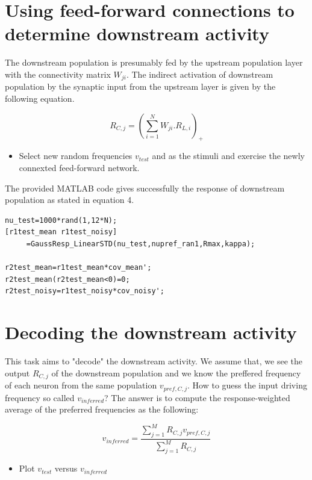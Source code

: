 \documentclass{article}
\begin{document}
\section{Using feed-forward connections to determine downstream activity}

The downstream population is presumably fed by the upstream population layer with the connectivity matrix $W_{ji}$. The indirect activation of downstream population by the synaptic input from the upstream layer is given by the following equation.

\begin{equation}
 R_{C,j}=(\sum_{i=1}^N W_{ji}\textbf{.}R_{L,i} )_+
\end{equation}

\begin{itemize}
 \item Select new random frequencies $v_{test}$ and as the stimuli and exercise the newly connexted feed-forward network.
\end{itemize}

The provided MATLAB code gives successfully the response of downstream population as stated in equation 4. 

\begin{verbatim}
nu_test=1000*rand(1,12*N);
[r1test_mean r1test_noisy] 
     =GaussResp_LinearSTD(nu_test,nupref_ran1,Rmax,kappa);

r2test_mean=r1test_mean*cov_mean';
r2test_mean(r2test_mean<0)=0;
r2test_noisy=r1test_noisy*cov_noisy';

\end{verbatim}

\section{Decoding the downstream activity}
This task aims to "decode" the downstream activity. We assume that, we see the output $R_{C,j}$ of the downstream population and we know the preffered frequency of each neuron from the same population $v_{pref,C,j}$. How to guess the input driving frequency so called $v_{inferred}$? The answer is to compute the response-weighted average of the preferred frequencies as the following:

\begin{equation}
 v_{inferred}=\dfrac{\sum_{j=1} ^M R_{C,j} v_{pref,C,j}}{\sum_{j=1} ^M R_{C,j}}
\end{equation}

\begin{itemize}
 \item Plot $v_{test}$ versus $v_{inferred}$
\end{itemize}
\end{document}
